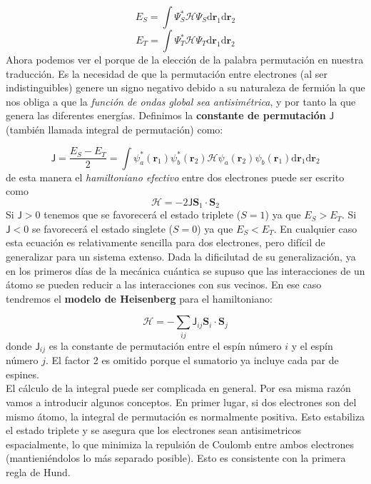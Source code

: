 \documentclass[12pt,a4paper]{book}
\numberwithin{equation}{section}
\numberwithin{figure}{section}
\newcommand{\D}{\mathrm{d}}
\newcommand{\Hcal}{\mathcal{H}}
\newcommand{\Jsf}{\mathsf{J}}
\newcommand{\rn}{\mathbf{r}}
\newcommand{\Sn}{\mathbf{S}}
\begin{document}
\begin{equation}
    E_S = \int \Psi_S^* \Hcal \Psi_S \D \rn_1 \D \rn_2
\end{equation}
\begin{equation}
    E_T = \int \Psi_T^* \Hcal \Psi_T \D \rn_1 \D \rn_2
\end{equation}
Ahora podemos ver el porque de la elección de la palabra permutación en nuestra traducción. Es la necesidad de que la permutación entre electrones (al ser indistinguibles) genere un signo negativo debido a su naturaleza de fermión la que nos obliga a que la \textit{función de ondas global sea antisimétrica}, y por tanto la que genera las diferentes energías. Definimos la \textbf{constante de permutación} $\mathsf{J}$ (también llamada integral de permutación) como:

\begin{equation}
    \Jsf = \frac{E_S - E_T}{2} = \int \psi_a^* (\rn_1) \psi_b^* (\rn_2) \Hcal \psi_a (\rn_2) \psi_b (\rn_1) \D \rn_1 \D \rn_2
\end{equation}
de esta manera el \textit{hamiltoniano efectivo} entre dos electrones puede ser escrito como
\begin{equation}
    \Hcal = - 2 \Jsf \Sn_1 \cdot \Sn_2 \label{Ec:04-02-05}
\end{equation}
Si $\Jsf>0$ tenemos que se favorecerá el estado triplete ($S=1$) ya que $E_S>E_T$. Si $\Jsf<0$ se favorecerá el estado singlete ($S=0$) ya que $E_S<E_T$. En cualquier caso esta ecuación es relativamente sencilla para dos electrones, pero difícil de generalizar para un sistema extenso. Dada la dificilutad de su generalización, ya en los primeros días de la mecánica cuántica se supuso que las interacciones de un átomo se pueden reducir a las interacciones con sus vecinos. En ese caso tendremos el \textbf{modelo de Heisenberg} para el hamiltoniano:

\begin{equation}
    \Hcal =- \sum_{ij} \Jsf_{ij} \Sn_i \cdot \Sn_j \label{Ec:04-02-005}
\end{equation}
donde $\Jsf_{ij}$ es la constante de permutación entre el espín número $i$ y el espín número $j$. El factor 2 es omitido porque el sumatorio ya incluye cada par de espines. \\

El cálculo de la integral puede ser complicada en general. Por esa misma razón vamos a introducir algunos conceptos. En primer lugar, si dos electrones son del mismo átomo, la integral de permutación es normalmente positiva. Esto estabiliza el estado triplete y se asegura que los electrones sean antisimetricos espacialmente, lo que minimiza la repulsión de Coulomb entre ambos electrones (mantieniéndolos lo más separado posible). Esto es consistente con la primera regla de Hund. \\
\end{document}
